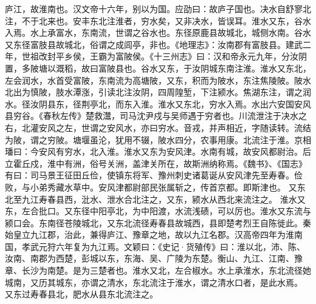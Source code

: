 \documentclass[12pt,UTF8]{ctexbook}
\begin{document}
庐江，故淮南也。汉文帝十六年，别以为国。应劭曰：故庐子国也。决水自舒寥北注，不于北来也。安丰东北注淮者，穷水矣，又非决水，皆误耳。淮水又东，谷水入焉。水上承富水，东南流，世谓之谷水也。东径原鹿县故城北，城侧水南。谷水又东径富肢县故城北，俗谓之成闾亭，非也。《地理志》：汝南郡有富肢县。建武二年，世祖改封平乡侯，王霸为富陂侯。《十三州志》曰：汉和帝永元九年，分汝阴置，多陂塘以溉稻，故曰富陂县也。谷水又东，于汝阴城东南注淮。淮水又东北，左会润水，水首受富陂，东南流为高塘陂，又东，积而为陂水，东注焦陵陂。陂水北出为慎陂，肢水潭涨，引读北注汝阴，四周隍堑，下注颍水。焦湖东注，谓之润水。径汝阴县东，径荆亭北，而东入淮。淮水又东北，穷水入焉。水出六安国安风县穷谷。《春秋左传》楚救灊，司马沈尹戍与吴师遇于穷者也。川流泄注于决水之右，北灌安风之左，世谓之安风水，亦曰穷水。音戎，并声相近，字随读转。流结为陂，谓之穷陂。塘堰虽沦，犹用不辍，陂水四分，农事用康。北流注于淮。京相璠曰：今安风有穷水，北入淮。淮水又东为安风津。水南有城，故安风都尉治。后立霍丘戍，淮中有洲，俗号关洲，盖津关所在，故斯洲纳称焉。《魏书》、《国志》有曰：司马景王征田丘俭，使镇东将军、豫州刺史诸葛诞从安风津先至寿春。俭败，与小弟秀藏水草中。安风津都尉部民张属斩之，传首京都。即斯津也。
又东北至九江寿春县西，沘水、泄水合北注之，又东，颍水从西北来流注之。
淮水又东，左合批口。又东径中阳亭北，为中阳渡，水流浅碛，可以厉也。淮水又东流与颍口会。东南径苍陵城北，又东北流径寿春县故城西，县即楚考烈王自陈徙此。秦始皇立九江郡，治此，兼得庐江、豫章之地，故以九江名郡。汉高帝四年为淮南国，孝武元狩六年复为九江焉。文颖曰：《史记·货殖传》曰：淮以北，沛、陈、汝南、南郡为西楚，彭城以东，东海、吴、广陵为东楚。衡山、九江、江南、豫章、长沙为南楚。是为三楚者也。淮水又北，左合椒水。水上承淮水，东北流径她城南，又历其城东，亦谓之清水，东北流注于淮水，谓之清水口者，是此水焉。
又东过寿春县北，肥水从县东北流注之。
\end{document}
